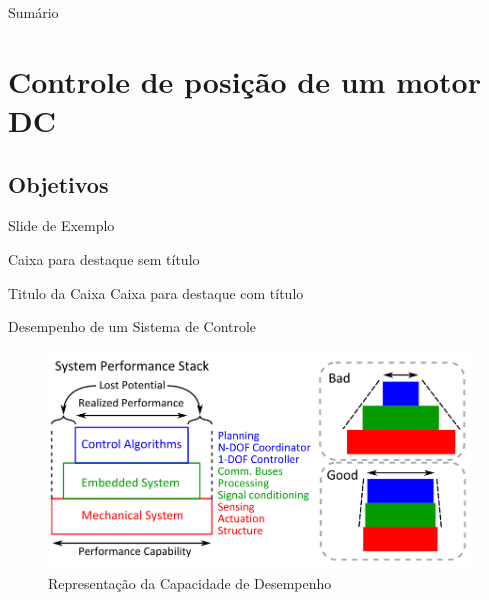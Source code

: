 \documentclass{beamer}
\title{}
\date{03 de Dezembro de 2020}
\author{Leonardo Cardoso Botelho \\ Rafael Lima}
\institute{Universidade de Brasília}
\begin{document}
\maketitle
\begin{frame}{Sumário}
\tableofcontents
\end{frame}

\section{Controle de posição de um motor DC}
\subsection{Objetivos}

\begin{frame}{Slide de Exemplo} %

\begin{block}{}
Caixa para destaque sem título
\end{block}

\begin{block}{Titulo da Caixa}
Caixa para destaque com título
\end{block}

\end{frame}

\begin{frame}{Desempenho de um Sistema de Controle}
\begin{figure}
    \centering
    \includegraphics[width = 0.9\linewidth]{src/tex/img/system_perfomance.png}
    \caption{Representação da Capacidade de Desempenho \cite{paine2014high}}
    \label{fig:system_perfomance}
\end{figure}
\end{frame}
\end{document}
